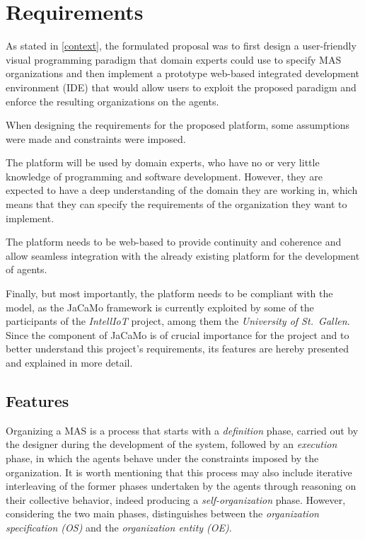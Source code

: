 \chapter{Requirements}\label{requirements}
As stated in \cref{context}, the formulated proposal was to first design a user-friendly visual programming paradigm that domain experts could use to specify MAS organizations and then implement a prototype web-based integrated development environment (IDE) that would allow users to exploit the proposed paradigm and enforce the resulting organizations on the agents.

When designing the requirements for the proposed platform, some assumptions were made and constraints were imposed.

The platform will be used by domain experts, who have no or very little knowledge of programming and software development.
However, they are expected to have a deep understanding of the domain they are working in, which means that they can specify the requirements of the organization they want to implement.

The platform needs to be web-based to provide continuity and coherence and allow seamless integration with the already existing platform for the development of agents.

Finally, but most importantly, the platform needs to be compliant with the \moiseplus{} model, as the JaCaMo framework is currently exploited by some of the participants of the \textit{IntellIoT} project, among them the \textit{University of St.\ Gallen}.
Since the \moise{} component of JaCaMo is of crucial importance for the project and to better understand this project's requirements, its features are hereby presented and explained in more detail.

\section{\moise{} Features}\label{moiseplus}
Organizing a MAS is a process that starts with a \textit{definition} phase, carried out by the designer during the development of the system, followed by an \textit{execution} phase, in which the agents behave under the constraints imposed by the organization.
It is worth mentioning that this process may also include iterative interleaving of the former phases undertaken by the agents through reasoning on their collective behavior, indeed producing a \textit{self-organization} phase. However, considering the two main phases, \moise{} distinguishes between the \textit{organization specification (OS)} and the \textit{organization entity (OE)}.

